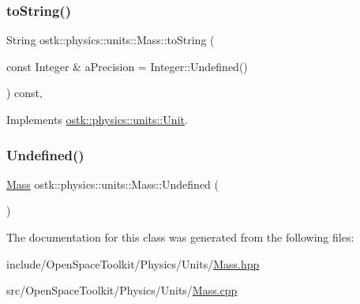 \mbox{\label{classostk_1_1physics_1_1units_1_1_mass_aa8993fb7d2dbed494bbb68f8ec002af5}} 
\subsubsection{\texorpdfstring{to\+String()}{toString()}}
{\footnotesize\ttfamily String ostk\+::physics\+::units\+::\+Mass\+::to\+String (\begin{DoxyParamCaption}\item[{const Integer \&}]{a\+Precision = {\ttfamily Integer\+:\+:Undefined()} }\end{DoxyParamCaption}) const\hspace{0.3cm}{\ttfamily [override]}, {\ttfamily [virtual]}}



Implements \hyperlink{classostk_1_1physics_1_1units_1_1_unit_a8162b4eb8221c7577af16ab8b399d07e}{ostk\+::physics\+::units\+::\+Unit}.

\mbox{\label{classostk_1_1physics_1_1units_1_1_mass_a5ea55f35b93bcb681508bf51bcf21f1c}} 
\subsubsection{\texorpdfstring{Undefined()}{Undefined()}}
{\footnotesize\ttfamily \hyperlink{classostk_1_1physics_1_1units_1_1_mass}{Mass} ostk\+::physics\+::units\+::\+Mass\+::\+Undefined (\begin{DoxyParamCaption}{ }\end{DoxyParamCaption})\hspace{0.3cm}{\ttfamily [static]}}



The documentation for this class was generated from the following files\+:\begin{DoxyCompactItemize}
\item 
include/\+Open\+Space\+Toolkit/\+Physics/\+Units/\hyperlink{_mass_8hpp}{Mass.\+hpp}\item 
src/\+Open\+Space\+Toolkit/\+Physics/\+Units/\hyperlink{_mass_8cpp}{Mass.\+cpp}\end{DoxyCompactItemize}
